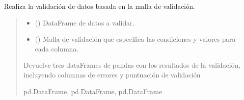 \documentclass[letterpaper,10pt,spanish]{sphinxmanual}
\begin{document}
\begin{fulllineitems}
\label{\detokenize{index:malla_functions.malla_validacion}}
\pysigstartsignatures
{}
\pysigstopsignatures
\sphinxAtStartPar
Realiza la validación de datos basada en la malla de validación.
\begin{quote}\begin{description}
\begin{itemize}
\item {} 
\sphinxAtStartPar
{} (\sphinxstyleliteralemphasis{\sphinxupquote{\sphinxhyphen{}}}) \textendash{} DataFrame de datos a validar.

\item {} 
\sphinxAtStartPar
{} (\sphinxstyleliteralemphasis{\sphinxupquote{\sphinxhyphen{}}}) \textendash{} Malla de validación que especifica las condiciones y valores para cada columna.

\end{itemize}

\sphinxAtStartPar
Devuelve tres dataFrames de pandas con los resultados de la validación, incluyendo columnas de errores y puntuación de validación

\sphinxAtStartPar
pd.DataFrame, pd.DataFrame, pd.DataFrame

\end{description}\end{quote}

\end{fulllineitems}




\renewcommand{\indexname}{Índice}
\printindex
\end{document}
